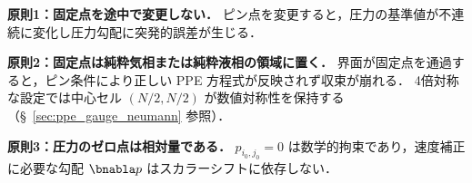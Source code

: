\noindent\textbf{原則1：固定点を途中で変更しない．}
ピン点を変更すると，圧力の基準値が不連続に変化し圧力勾配に突発的誤差が生じる．

\noindent\textbf{原則2：固定点は純粋気相または純粋液相の領域に置く．}
界面が固定点を通過すると，ピン条件により正しい PPE 方程式が反映されず収束が崩れる．
4倍対称な設定では中心セル $(N/2,N/2)$ が数値対称性を保持する
（§~\ref{sec:ppe_gauge_neumann} 参照）．

\noindent\textbf{原則3：圧力のゼロ点は相対量である．}
$p_{i_0,j_0} = 0$ は数学的拘束であり，速度補正に必要な勾配 $\bnabla p$ はスカラーシフトに依存しない．
